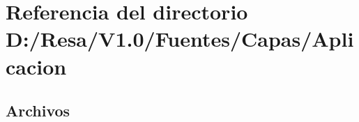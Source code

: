 \section{Referencia del directorio D\+:/\+Resa/\+V1.0/\+Fuentes/\+Capas/\+Aplicacion}
\label{dir_b49841901c059ea1ad42467ba8ae6ea5}
\subsection*{Archivos}
\begin{DoxyCompactItemize}
\end{DoxyCompactItemize}
